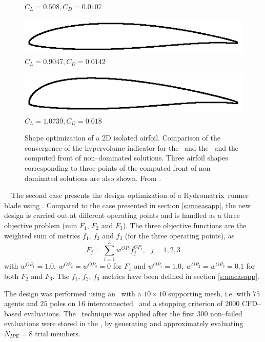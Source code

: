 \documentclass{vki_ls}
\newcommand{\xeraki}{\Pisymbol{ding}{13}~~}
\begin{document}
\begin{figure}[!ht]
\begin{minipage}{1.0\linewidth}
\begin{minipage}{0.32\linewidth}
        $C_L\!=\!0.508, C_D\!=\!0.0107$
    \end{minipage}
    \begin{minipage}{0.32\linewidth}
        \includegraphics[trim=0 0 0 90,clip,scale=0.7]{amaea/airfoil02.eps}
        $C_L\!=\!0.9047, C_D\!=\!0.0142$
    \end{minipage}
    \begin{minipage}{0.32\linewidth}
        \includegraphics[trim=0 0 0 90,clip,scale=0.7]{amaea/airfoil03.eps}
        $C_L\!=\!1.0739, C_D\!=\!0.018$
    \end{minipage}
\end{minipage}
    \caption{Shape optimization of a 2D isolated airfoil. Comparison of
             the convergence of the hypervolume indicator for the \AEA\
             and the \AMAEA\ and the computed front of non--dominated
             solutions. Three airfoil shapes corresponding to
             three points of the computed front of non--dominated
             solutions are also shown. From \cite{LTT_2_045}.}
    \label{aeas:isol2d}
\end{figure}
%

%
%
\xeraki The second case presents the design--optimization of a Hydromatrix\textregistered~runner blade using \AMAEA. 
Compared to the case presented in section \ref{s:maeasapp}, the new design is carried out at different operating points and is handled as a three objective problem (min $F_1$, $F_2$ and $F_3$).
The three objective functions are the weighted sum of metrics $f_1$, $f_2$ and $f_3$ (for the three operating points), as
\begin{equation}
   F_j = \sum_{i=1}^3 w^{OP_i} f_j^{OP_i}, ~~~ j=1,2,3
   \nonumber
\end{equation}
with $w^{OP_1}=1.0,~ w^{OP_2}=w^{OP_3}=0$ for $F_1$ 
and  $w^{OP_1}=1.0,~ w^{OP_2}=w^{OP_3}=0.1$ for both $F_2$ and $F_3$.
The $f_1$, $f_2$, $f_3$ metrics have been defined in section \ref{s:maeasapp}.

The design was performed using an \AMAEA\ with a $10\!\times\!10$ supporting mesh, i.e. with $75$ agents and $25$ poles on $16$ interconnected \CPUs\ and a stopping criterion of $2000$ CFD--based evaluations.
The \IPE\ technique was applied after the first $300$ non--failed evaluations were stored in the \DB, by generating and approximately evaluating $N_{IPE}\!=\!8$ trial members. 
\end{document}
